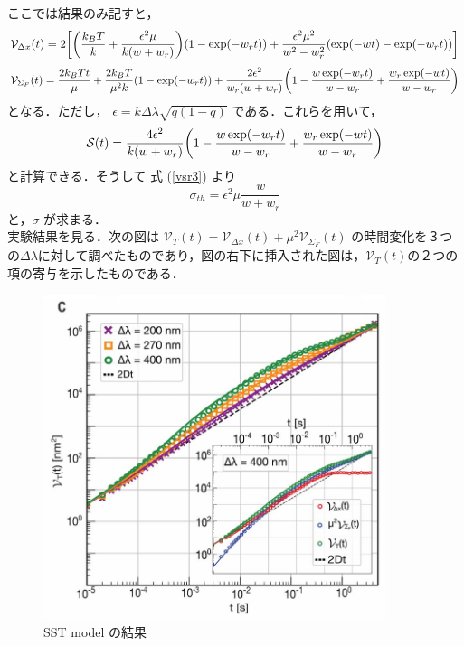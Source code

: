\documentclass{jsarticle}
\numberwithin{equation}{section}
\theoremstyle{definition}
\begin{document}
ここでは結果のみ記すと，
\begin{equation}
  \mathcal{V} _{\Delta x} (t) = 2 \qty[ \qty(\frac{k_B T}{k} + \frac{\epsilon^2 \mu}{k (w + w_r)}) \qty(1 - \exp(- w_r t)) + \frac{\epsilon^2 \mu^2}{w^2 - w_r^2} \qty( \exp(-wt) - \exp(-w_r t) ) ]
\end{equation}
\begin{equation}
  \mathcal{V} _{\Sigma_F} (t) = \frac{2k_B T t}{\mu} + \frac{2k_B T}{\mu^2 k} \qty( 1 - \exp(-w_r t) ) + \frac{2\epsilon^2}{w_r (w + w_r)} \qty( 1 - \frac{w \exp(-w_r t)}{w - w_r} + \frac{w_r \exp(-w t)}{w - w_r})
\end{equation}
となる．ただし， $\epsilon = k \Delta \lambda \sqrt{ q (1-q) }$ である．これらを用いて，
\begin{equation}
  \mathcal{S} (t) = \frac{4 \epsilon^2}{k (w + w_r)} \qty( 1 - \frac{w \exp(-w_r t)}{w - w_r} + \frac{w_r \exp(-w t)}{w - w_r})
\end{equation}
と計算できる．そうして
式 (\ref{vsr3}) より 
\begin{equation}
  \sigma_{th} = \epsilon^2 \mu \frac{w}{w + w_r}
\end{equation}
と，$\sigma$ が求まる．\\
\quad 実験結果を見る．次の図は $\mathcal{V}_T (t) =  \mathcal{V} _{\Delta x} (t) + \mu^2 \mathcal{V} _{\Sigma_F} (t)$ の時間変化を３つの$\Delta \lambda$に対して調べたものであり，図の右下に挿入された図は，$\mathcal{V}_T (t)$の２つの項の寄与を示したものである．

\begin{figure}[H]
  \begin{center}  
  \includegraphics[width=10cm]{vsr_fig2c.png}  
  \end{center}
  \caption{SST model の結果}
\end{figure}
\end{document}
